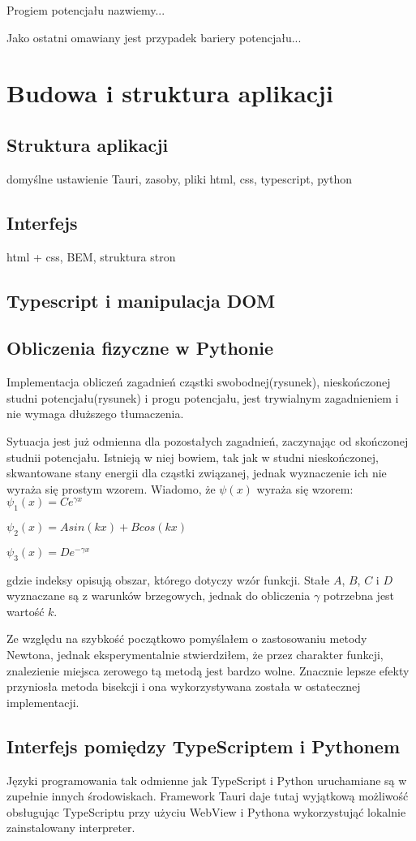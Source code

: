 \documentclass{SGGW-thesis}
\begin{document}
Progiem potencjału nazwiemy...

Jako ostatni omawiany jest przypadek bariery potencjału...
	
	
\chapter{Budowa i struktura aplikacji}
	\section{Struktura aplikacji}
	domyślne ustawienie Tauri, zasoby, pliki html, css, typescript, python
	\section{Interfejs}
	html + css, BEM, struktura stron
	\section{Typescript i manipulacja DOM}
	\section{Obliczenia fizyczne w Pythonie}
		Implementacja obliczeń zagadnień cząstki swobodnej(rysunek), nieskończonej studni potencjału(rysunek) i progu potencjału, jest trywialnym zagadnieniem i nie wymaga dłuższego tłumaczenia.
		
		Sytuacja jest już odmienna dla pozostałych zagadnień, zaczynając od skończonej studnii potencjału. Istnieją w niej bowiem, tak jak w studni nieskończonej, skwantowane stany energii dla cząstki związanej, jednak wyznaczenie ich nie wyraża się prostym wzorem. Wiadomo, że $\psi(x)$ wyraża się wzorem:
		$\psi_1(x) = Ce^{\gamma x}$
		
		$\psi_2(x) = Asin(kx) + Bcos(kx)$
		
		$\psi_3(x) = De^{-\gamma x}$

gdzie indeksy opisują obszar, którego dotyczy wzór funkcji.
		Stałe $A$, $B$, $C$ i $D$ wyznaczane są z warunków brzegowych, jednak do obliczenia $\gamma$ potrzebna jest wartość $k$.
		
		Ze względu na szybkość początkowo pomyślałem o zastosowaniu metody Newtona, jednak eksperymentalnie stwierdziłem, że przez charakter funkcji, znalezienie miejsca zerowego tą metodą jest bardzo wolne. Znacznie lepsze efekty przyniosła metoda bisekcji i ona wykorzystywana została w ostatecznej implementacji.
		
		
	\section{Interfejs pomiędzy TypeScriptem i Pythonem}
		Języki programowania tak odmienne jak TypeScript i Python uruchamiane są w zupełnie innych środowiskach. Framework Tauri daje tutaj wyjątkową możliwość obsługując TypeScriptu przy użyciu WebView\cite{tauri webview} i Pythona wykorzystująć lokalnie zainstalowany interpreter\cite{tauri shell}.
		
\end{document}
